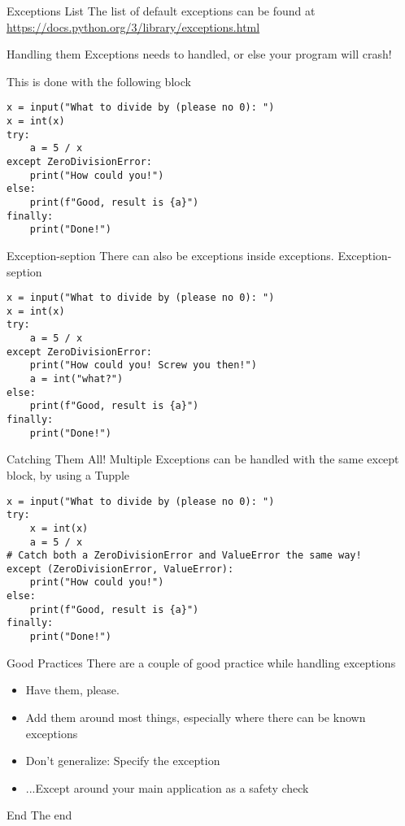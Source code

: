 \documentclass[10pt]{beamer}
\begin{document}
\begin{frame}[containsverbatim]{Exceptions List}
    The list of default exceptions can be found at \url{https://docs.python.org/3/library/exceptions.html}
\end{frame}

\begin{frame}[containsverbatim]{Handling them}
    Exceptions needs to handled, or else your program will crash!

    This is done with the following block

    \begin{verbatim}
x = input("What to divide by (please no 0): ")
x = int(x)
try:
    a = 5 / x
except ZeroDivisionError:
    print("How could you!")
else:
    print(f"Good, result is {a}")
finally:
    print("Done!")
    \end{verbatim}
\end{frame}

\begin{frame}[containsverbatim]{Exception-seption}
    There can also be exceptions inside exceptions. Exception-seption

    \begin{verbatim}
x = input("What to divide by (please no 0): ")
x = int(x)
try:
    a = 5 / x
except ZeroDivisionError:
    print("How could you! Screw you then!")
    a = int("what?")
else:
    print(f"Good, result is {a}")
finally:
    print("Done!")
    \end{verbatim}
\end{frame}

\begin{frame}[containsverbatim]{Catching Them All!}
    Multiple Exceptions can be handled with the same except block, by using a Tupple

    \begin{verbatim}
x = input("What to divide by (please no 0): ")
try:
    x = int(x)
    a = 5 / x
# Catch both a ZeroDivisionError and ValueError the same way!
except (ZeroDivisionError, ValueError):
    print("How could you!")
else:
    print(f"Good, result is {a}")
finally:
    print("Done!")
    \end{verbatim}
\end{frame}

\begin{frame}{Good Practices}
    There are a couple of good practice while handling exceptions
    \begin{itemize}
        \item Have them, please.
        \item Add them around most things, especially where there can be known exceptions
        \item Don't generalize: Specify the exception
        \item ...Except around your main application as a safety check
    \end{itemize}
\end{frame}

\begin{frame}[standout]{End}
  The end
\end{frame}
\end{document}
